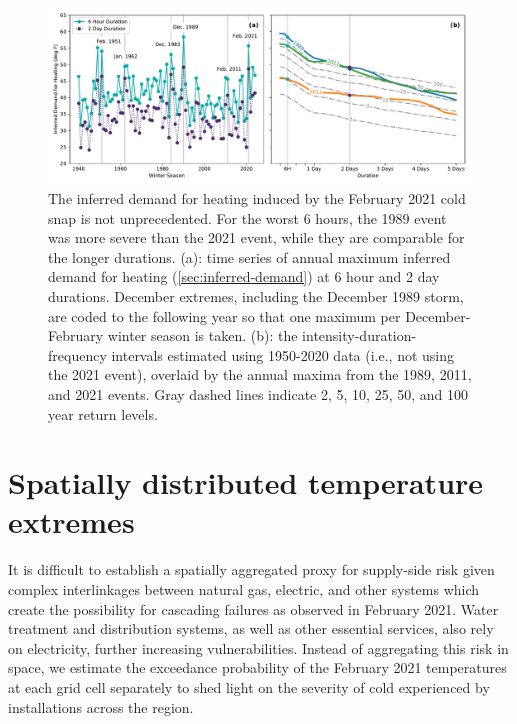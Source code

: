 \documentclass[12pt]{iopart}
\begin{document}
\begin{figure}
  \centering
  \includegraphics[width=\textwidth]{ERCOT_HDD_IDF_MLE_popweighted.pdf}
  \caption{
    The inferred demand for heating induced by the February 2021 cold snap is not unprecedented.
    For the worst 6 hours, the 1989 event was more severe than the 2021 event, while they are comparable for the longer durations.
    (a): time series of annual maximum inferred demand for heating (\cref{sec:inferred-demand}) at 6 hour and 2 day durations.
    December extremes, including the December 1989 storm, are coded to the following year so that one maximum per December-February winter season is taken.
    (b): the intensity-duration-frequency intervals estimated using 1950-2020 data (i.e., not using the 2021 event), overlaid by the annual maxima from the 1989, 2011, and 2021 events.
    Gray dashed lines indicate 2, 5, 10, 25, 50, and 100 year return levels.
  }\label{fig:idf_weighted}
\end{figure}

\section{Spatially distributed temperature extremes}

It is difficult to establish a spatially aggregated proxy for supply-side risk given complex interlinkages between natural gas, electric, and other systems which create the possibility for cascading failures as observed in February 2021.
Water treatment and distribution systems, as well as other essential services, also rely on electricity, further increasing vulnerabilities.
Instead of aggregating this risk in space, we estimate the exceedance probability of the February 2021 temperatures at each grid cell separately to shed light on the severity of cold experienced by installations across the region.
\end{document}
